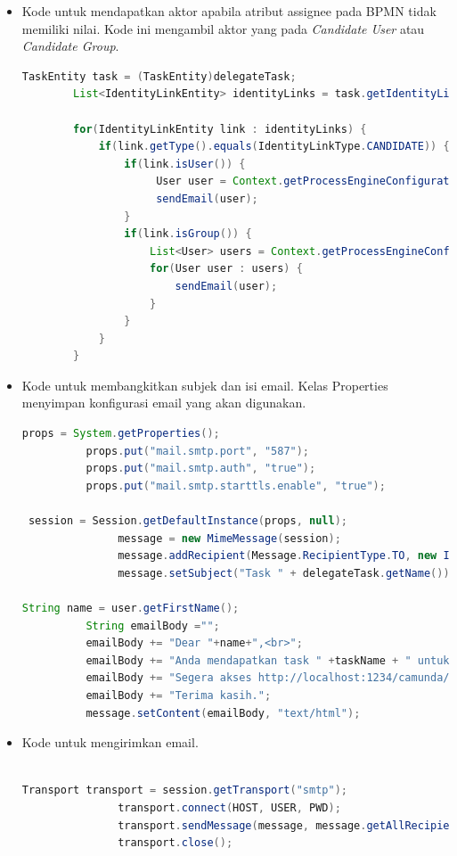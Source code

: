 \begin{itemize}
		\item Kode untuk mendapatkan aktor apabila atribut assignee pada BPMN tidak memiliki nilai. Kode ini mengambil aktor yang pada \textit{Candidate User} atau \textit{Candidate Group}.
	\begin{lstlisting}[language=Java,basicstyle=\tiny,caption =TaskAssignmentListener.java]
	    	TaskEntity task = (TaskEntity)delegateTask;
    	List<IdentityLinkEntity> identityLinks = task.getIdentityLinks();
    	
    	for(IdentityLinkEntity link : identityLinks) {
    		if(link.getType().equals(IdentityLinkType.CANDIDATE)) {
    		    if(link.isUser()) {
	    		     User user = Context.getProcessEngineConfiguration().getIdentityService().createUserQuery().userId(link.getUserId()).singleResult();
	    		     sendEmail(user);
    		    }
    		    if(link.isGroup()) {
    		        List<User> users = Context.getProcessEngineConfiguration().getIdentityService().createUserQuery().memberOfGroup(link.getGroupId()).list();
    		        for(User user : users) {
    		        	sendEmail(user);
    		        }
    		    }
    		}
    	}
	\end{lstlisting}
	
	

	\item Kode untuk membangkitkan subjek dan isi email. Kelas Properties menyimpan konfigurasi email yang akan digunakan. 
	\begin{lstlisting}[language=Java,basicstyle=\tiny,caption=TaskAssignmentListener.java]
 props = System.getProperties();
          props.put("mail.smtp.port", "587");
          props.put("mail.smtp.auth", "true");
          props.put("mail.smtp.starttls.enable", "true");
					
 session = Session.getDefaultInstance(props, null);
               message = new MimeMessage(session);
               message.addRecipient(Message.RecipientType.TO, new InternetAddress(recipient));
               message.setSubject("Task " + delegateTask.getName());
               
String name = user.getFirstName();
          String emailBody ="";
          emailBody += "Dear "+name+",<br>";
          emailBody += "Anda mendapatkan task " +taskName + " untuk dikerjakan.<br>";
          emailBody += "Segera akses http://localhost:1234/camunda/app/tasklist/default/#/?task="+taskId +" untuk menjalankannya.<br>";
          emailBody += "Terima kasih.";
          message.setContent(emailBody, "text/html");

\end{lstlisting}

	\item Kode untuk mengirimkan email.
	\begin{lstlisting}[language=Java,basicstyle=\tiny,caption=TaskAssignmentListener.java]

Transport transport = session.getTransport("smtp");            
               transport.connect(HOST, USER, PWD);
               transport.sendMessage(message, message.getAllRecipients());
               transport.close();
\end{lstlisting}
	
\end{itemize}

